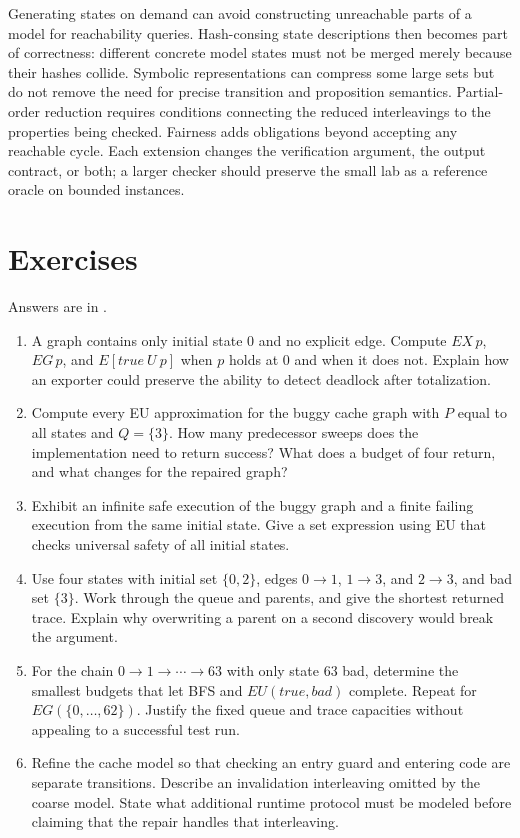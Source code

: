 Generating states on demand can avoid constructing unreachable parts of a model for reachability queries.
Hash-consing state descriptions then becomes part of correctness: different concrete model states must not be merged merely because their hashes collide.
Symbolic representations can compress some large sets but do not remove the need for precise transition and proposition semantics.
Partial-order reduction requires conditions connecting the reduced interleavings to the properties being checked.
Fairness adds obligations beyond accepting any reachable cycle.
Each extension changes the verification argument, the output contract, or both; a larger checker should preserve the small lab as a reference oracle on bounded instances.

\section{Exercises}
\label{sec:ch48-exercises}

Answers are in .
\begin{enumerate}
  \item \label{ex:ch48-dead-end}
    A graph contains only initial state 0 and no explicit edge.
    Compute $EX\,p$, $EG\,p$, and $E[\mathit{true}\ U\ p]$ when $p$ holds at 0 and when it does not.
    Explain how an exporter could preserve the ability to detect deadlock after totalization.
  \item \label{ex:ch48-until-rounds}
    Compute every EU approximation for the buggy cache graph with $P$ equal to all states and $Q=\{3\}$.
    How many predecessor sweeps does the implementation need to return success?
    What does a budget of four return, and what changes for the repaired graph?
  \item \label{ex:ch48-existential-safety}
    Exhibit an infinite safe execution of the buggy graph and a finite failing execution from the same initial state.
    Give a set expression using EU that checks universal safety of all initial states.
  \item \label{ex:ch48-multiple-roots}
    Use four states with initial set $\{0,2\}$, edges $0\to1$, $1\to3$, and $2\to3$, and bad set $\{3\}$.
    Work through the queue and parents, and give the shortest returned trace.
    Explain why overwriting a parent on a second discovery would break the argument.
  \item \label{ex:ch48-capacity}
    For the chain $0\to1\to\cdots\to63$ with only state 63 bad, determine the smallest budgets that let BFS and $EU(\mathit{true},\mathit{bad})$ complete.
    Repeat for $EG(\{0,\ldots,62\})$.
    Justify the fixed queue and trace capacities without appealing to a successful test run.
  \item \label{ex:ch48-refinement}
    Refine the cache model so that checking an entry guard and entering code are separate transitions.
    Describe an invalidation interleaving omitted by the coarse model.
    State what additional runtime protocol must be modeled before claiming that the repair handles that interleaving.
\end{enumerate}

